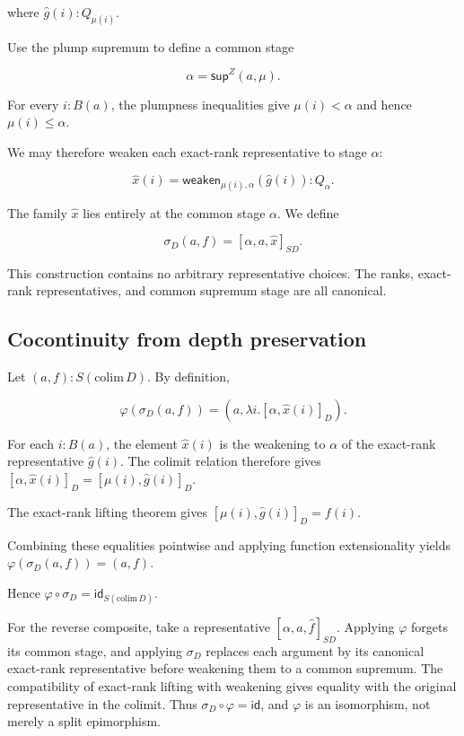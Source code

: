 \documentclass[runningheads]{llncs}
\begin{document}
where \(\widehat{g} (i):Q_{\mu (i)}\).

Use the plump supremum to define a common stage

\[
\alpha = \mathsf{sup}^Z (a,\mu).
\]

For every \(i:B (a)\), the plumpness inequalities give
\(\mu (i)<\alpha\) and hence \(\mu (i)\leq\alpha.\)

We may therefore weaken each exact-rank representative to stage
\(\alpha\):

\[
\widehat{x} (i)
=
\mathsf{weaken}_{\mu (i),\alpha} (\widehat{g} (i))
:
Q_\alpha.
\]

The family \(\widehat{x}\) lies entirely at the common stage \(\alpha\).
We define

\[
\sigma_D (a,f) = [\alpha,a,\widehat{x}]_{SD}.
\]

This construction contains no arbitrary representative choices. The
ranks, exact-rank representatives, and common supremum stage are all
canonical.

\subsection{Cocontinuity from depth preservation}\label{cocontinuity-from-depth-preservation}

Let \((a,f):S (\mathrm{colim}\,D)\). By definition,

\[
\varphi (\sigma_D (a,f))
=
\left(
 a,
  \lambda i.[\alpha,\widehat{x} (i)]_D
\right).
\]

For each \(i:B (a)\), the element \(\widehat{x} (i)\) is the weakening
to \(\alpha\) of the exact-rank representative \(\widehat{g} (i)\). The
colimit relation therefore gives
\([\alpha,\widehat{x} (i)]_D = [\mu (i),\widehat{g} (i)]_D.\)

The exact-rank lifting theorem gives
\([\mu (i),\widehat{g} (i)]_D = f (i).\)

Combining these equalities pointwise and applying function
extensionality yields \(\varphi (\sigma_D (a,f)) = (a,f).\)

Hence \(\varphi\circ\sigma_D = \mathsf{id}_{S (\mathrm{colim}\,D)}.\)

For the reverse composite, take a representative
\([\alpha,a,\widehat{f}]_{SD}\). Applying \(\varphi\) forgets its common
stage, and applying \(\sigma_D\) replaces each argument by its canonical
exact-rank representative before weakening them to a common supremum.
The compatibility of exact-rank lifting with weakening gives equality
with the original representative in the colimit. Thus
\(\sigma_D\circ\varphi=\mathsf{id}\), and \(\varphi\) is an
isomorphism, not merely a split epimorphism.
\end{document}
